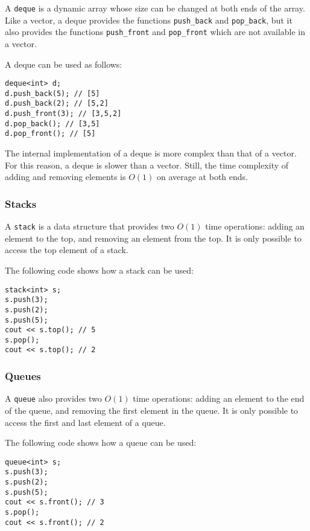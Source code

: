 
A \texttt{deque} is a dynamic array
whose size can be changed at both ends of the array.
Like a vector, a deque provides the functions
\texttt{push\_back} and \texttt{pop\_back}, but
it also provides the functions
\texttt{push\_front} and \texttt{pop\_front}
which are not available in a vector.

A deque can be used as follows:
\begin{lstlisting}
deque<int> d;
d.push_back(5); // [5]
d.push_back(2); // [5,2]
d.push_front(3); // [3,5,2]
d.pop_back(); // [3,5]
d.pop_front(); // [5]
\end{lstlisting}

The internal implementation of a deque
is more complex than that of a vector.
For this reason, a deque is slower than a vector.
Still, the time complexity of adding and removing
elements is $O(1)$ on average at both ends.

\subsubsection{Stacks}


A \texttt{stack}
is a data structure that provides two
$O(1)$ time operations:
adding an element to the top,
and removing an element from the top.
It is only possible to access the top
element of a stack.

The following code shows how a stack can be used:
\begin{lstlisting}
stack<int> s;
s.push(3);
s.push(2);
s.push(5);
cout << s.top(); // 5
s.pop();
cout << s.top(); // 2
\end{lstlisting}
\subsubsection{Queues}


A \texttt{queue} also
provides two $O(1)$ time operations:
adding an element to the end of the queue,
and removing the first element in the queue.
It is only possible to access the first
and last element of a queue.

The following code shows how a queue can be used:
\begin{lstlisting}
queue<int> s;
s.push(3);
s.push(2);
s.push(5);
cout << s.front(); // 3
s.pop();
cout << s.front(); // 2
\end{lstlisting}

